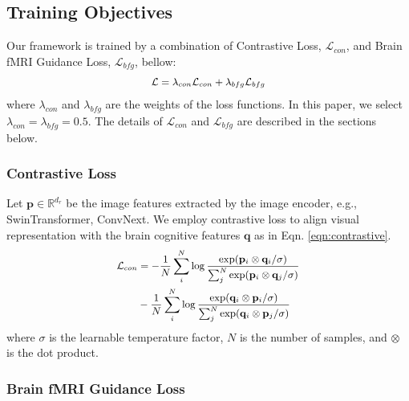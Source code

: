 \subsection{Training Objectives}



Our framework is trained by a combination of Contrastive Loss, $\mathcal{L}_{con}$, and Brain fMRI Guidance Loss, $\mathcal{L}_{bfg}$, bellow:
\begin{equation} \label{eqn:contrastive}
\small
\begin{split}
    \mathcal{L} = \lambda_{con} \mathcal{L}_{con} + \lambda_{bfg} \mathcal{L}_{bfg}
\end{split}
\end{equation}
where $\lambda_{con}$ and $\lambda_{bfg}$ are the weights of the loss functions. In this paper, we select $\lambda_{con} = \lambda_{bfg} = 0.5$. The details of $\mathcal{L}_{con}$ and $\mathcal{L}_{bfg}$ are described in the sections below.
\subsubsection{Contrastive Loss}

Let $\mathbf{p} \in \mathbb{R}^{d_r}$ be the image features extracted by the image encoder, e.g., SwinTransformer, ConvNext. We employ contrastive loss \cite{chen2020simple} to align visual representation with the brain cognitive features $\mathbf{q}$ as in Eqn. \eqref{eqn:contrastive}.
\begin{equation} \label{eqn:contrastive}
\small
\begin{split}
    \mathcal{L}_{con} &= -\frac{1}{N}\sum_i^N \log\frac{\exp(\mathbf{p}_i \otimes \mathbf{q}_i/\sigma)}{\sum_j^N\exp(\mathbf{p}_i \otimes \mathbf{q}_j/\sigma)} \\
    &- \frac{1}{N}\sum_i^N \log\frac{\exp(\mathbf{q}_i \otimes \mathbf{p}_i/\sigma)}{\sum_j^N\exp(\mathbf{q}_i \otimes \mathbf{p}_j/\sigma)}
\end{split}
\end{equation}
where $\sigma$ is the learnable temperature factor,
$N$ is the number of samples, and $\otimes$ is the dot product. 

\subsubsection{Brain fMRI Guidance Loss}
\label{sec:guidance_loss}

